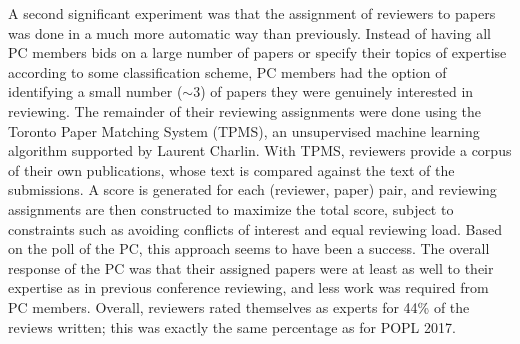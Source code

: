 A second significant experiment was that the assignment of
reviewers to papers was done in a much more automatic way than
previously. Instead of having all PC members bids on a large number
of papers or specify their topics of expertise according to some
classification scheme, PC members had the option of identifying a
small number ($\sim\!3$) of papers they were genuinely interested in
reviewing. The remainder of their reviewing assignments were done
using the Toronto Paper Matching System (TPMS), an unsupervised
machine learning algorithm supported by Laurent Charlin. With TPMS, reviewers
provide a corpus of their own publications, whose text is compared
against the text of the submissions. A score is generated for each
(reviewer, paper) pair, and reviewing assignments are then constructed
to maximize the total score, subject to constraints such as
avoiding conflicts of interest and equal reviewing load. Based on
the poll of the PC, this approach seems to have been a success.  The
overall response of the PC was that their assigned papers were
at least as well to their expertise as in previous conference
reviewing, and less work was required from PC members. Overall,
reviewers rated themselves as experts for 44\% of the reviews written;
this was exactly the same percentage as for POPL 2017.

